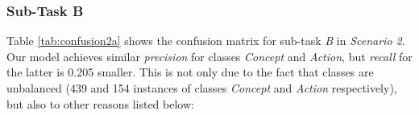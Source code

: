 \documentclass[a4paper,11pt,twocolumn,twoside]{article}
\begin{document}

\subsubsection{Sub-Task B}
\label{sec:subtaskb}

Table \ref{tab:confusion2a} shows the confusion matrix for sub-task \emph{B} in \emph{Scenario 2}. Our model achieves similar \emph{precision} for classes \emph{Concept} and \emph{Action}, but \emph{recall} for the latter is 0.205 smaller. This is not only due to the fact that classes are unbalanced (439 and 154 instances of classes \emph{Concept} and \emph{Action} respectively), but also to other reasons listed below:
\end{document}
